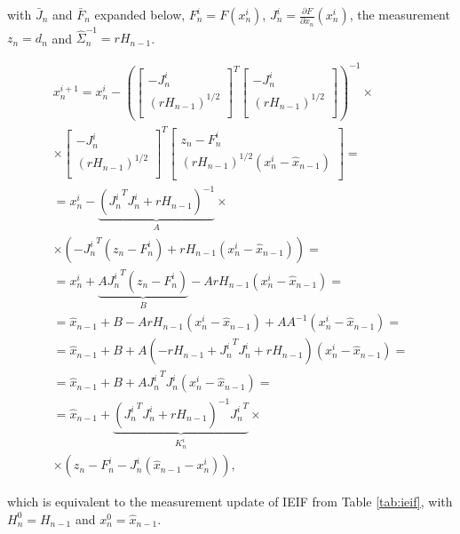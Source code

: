 with $\bar{J}_n$ and $\bar{F}_n$ expanded below, $F_n^i = F(x_n^i)$, 
 $J_n^i = \frac{\partial F}{\partial x_n}(x_n^i)$, the measurement $z_n = d_n$ and $\hat{\Sigma}_n^{-1} = r H_{n - 1}$.
 
 \begin{align*}
x_n^{i + 1}= x_n^{i} - \left(
\left[
	\begin{array}{cc}
		- J_n^i \\
		\left(r H_{n - 1}\right)^{1/2} \\
	\end{array}
\right]^T 
\left[
	\begin{array}{c}
		- J_n^i \\
		\left(r H_{n - 1}\right)^{1/2} \\
	\end{array}
\right]
\right)^{-1} \times\\
\times \left[
	\begin{array}{cc}
		- J_n^i \\
		\left(r H_{n - 1}\right)^{1/2} \\
	\end{array}
\right]^T 
\left[
	\begin{array}{c}
		z_n - F_n^i \\
		\left(r H_{n - 1}\right)^{1/2}(x_n^i - \hat{x}_{n - 1}) \\
	\end{array}
\right] = \\
= x_n^{i} - \underbrace{\left({J_n^i}^T J_n^i + r H_{n - 1}\right)^{-1}}_{A} \times \\
\times \left( - {J_n^i}^T(z_n - F_n^i) + r H_{n - 1}(x_n^i - \hat{x}_{n - 1})\right)  = \\
= x_n^i +\underbrace{A {J_n^i}^T(z_n - F_n^i)}_B - A r H_{n - 1}(x_n^i - \hat{x}_{n - 1})  = \\
= \hat{x}_{n - 1} + B  - A r H_{n - 1}(x_n^i - \hat{x}_{n - 1}) + A A^{-1}( x_n^i - \hat{x}_{n - 1}) = \\
= \hat{x}_{n - 1} + B + A(- r H_{n - 1} + {J_n^i}^T J_n^i + r H_{n - 1})(x_n^i - \hat{x}_{n - 1}) = \\
= \hat{x}_{n - 1} + B + A {J_n^i}^T J_n^i (x_n^i - \hat{x}_{n - 1}) = \\
= \hat{x}_{n - 1} + \underbrace{\left({J_n^i}^T J_n^i + r H_{n - 1}\right)^{-1} {J_n^i}^T}_{K_n^i} \times \\
\times (z_n - F_n^i - J_n^i (\hat{x}_{n - 1} - x_n^i)),
 \end{align*}
 
 which is equivalent to the measurement update of IEIF from Table \ref{tab:ieif}, with $H_n^0 = H_{n-1}$ and $x_n^0 = \hat{x}_{n - 1}$.
